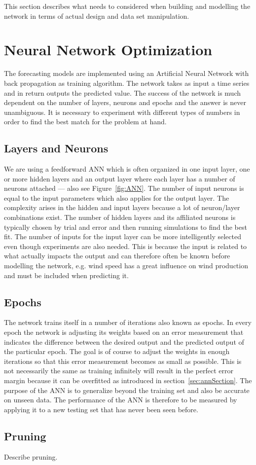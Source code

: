 This section describes what needs to considered when building and modelling the network in terms of actual design and data set manipulation.

\section{Neural Network Optimization}
\label{sec:neuralNetworkOptimization}
The forecasting models are implemented using an Artificial Neural Network with back propagation as training algorithm. The network takes as input a time series and in return outputs the predicted value. The success of the network is much dependent on the number of layers, neurons and epochs and the answer is never unambiguous. It is necessary to experiment with different types of numbers in order to find the best match for the problem at hand.

\subsection{Layers and Neurons}
\label{sec:layersAndNeurons}
We are using a feedforward ANN which is often organized in one input layer, one or more hidden layers and an output layer where each layer has a number of neurons attached\cite{1} --- also see Figure~\ref{fig:ANN}. The number of input neurons is equal to the input parameters which also applies for the output layer. 
The complexity arises in the hidden and input layers because a lot of neuron/layer combinations exist. The number of hidden layers and its affiliated neurons is typically chosen by trial and error and then running simulations to find the best fit\cite{1}. The number of inputs for the input layer can be more intelligently selected even though experiments are also needed. This is because the input is related to what actually impacts the output and can therefore often be known before modelling the network, e.g. wind speed has a great influence on wind production and must be included when predicting it.

\subsection{Epochs}
\label{sec:epochs}
The network trains itself in a number of iterations also known as epochs. In every epoch the network is adjusting its weights based on an error measurement that indicates the difference between the desired output and the predicted output of the particular epoch\cite{1}. The goal is of course to adjust the weights in enough iterations so that this error measurement becomes as small as possible. This is not necessarily the same as training infinitely will result in the perfect error margin because it can be overfitted as introduced in section~\ref{sec:annSection}. The purpose of the ANN is to generalize beyond the training set and also be accurate on unseen data\cite{1}. The performance of the ANN is therefore to be measured by applying it to a new testing set that has never been seen before.

\subsection{Pruning}
\label{sec:pruning}
Describe pruning.